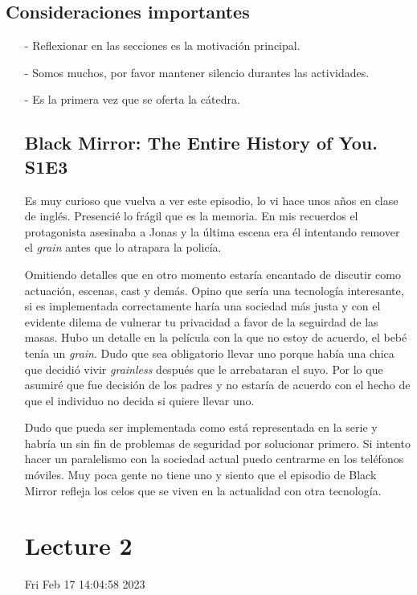 \documentclass{article}
\theoremstyle{definition}
\begin{document}
\subsection{Consideraciones importantes}

\begin{itemize}

  \item[-] Reflexionar en las secciones es la motivación principal.
  \item[-] Somos muchos, por favor mantener silencio durantes las 
    actividades.
  \item[-] Es la primera vez que se oferta la cátedra.

\subsection{Black Mirror: The Entire History of You. S1E3}
\begin{flushleft}
Es muy curioso que vuelva a ver este episodio, lo vi hace unos años
en clase de inglés. Presencié lo frágil que es la memoria. En mis 
recuerdos el protagonista asesinaba a Jonas y la última escena era 
él intentando remover el \textit{grain} antes que lo atrapara la 
policía.

Omitiendo detalles que en otro momento estaría encantado de discutir
como actuación, escenas, cast y demás. Opino que sería una tecnología
interesante, si es implementada correctamente haría una sociedad más 
justa y con el evidente dilema de vulnerar tu privacidad a favor de 
la seguirdad de las masas. Hubo un detalle en la película con la que 
no estoy de acuerdo, el bebé tenía un \textit{grain}. Dudo que sea 
obligatorio llevar uno porque había una chica que decidió vivir
\textit{grainless} después que le arrebataran el suyo. Por lo que 
asumiré que fue decisión de los padres y no estaría de acuerdo con 
el hecho de que el individuo no decida si quiere llevar uno.

Dudo que pueda ser implementada como está representada 
en la serie y habría un sin fin de problemas de seguridad por 
solucionar primero. Si intento hacer un paralelismo con la sociedad 
actual puedo centrarme en los teléfonos móviles. Muy poca gente no 
tiene uno y siento que el episodio de Black Mirror refleja los 
celos que se viven en la actualidad con otra tecnología.

\section{Lecture 2}
Fri Feb 17 14:04:58 2023

\subsection{}

\end{flushleft}


\end{itemize}
\end{document}
